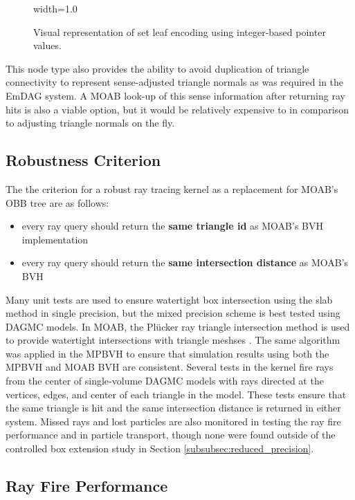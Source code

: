 \begin{figure}
  {width=1.0\textwidth}
  \caption[Graphic of surface root node encoding.]{Visual representation of set
    leaf encoding using integer-based pointer values.}
  \label{fig:set_leaf_encoding}
\end{figure}

This node type also provides the ability to avoid duplication of triangle
connectivity to represent sense-adjusted triangle normals as was required in the
EmDAG system. A MOAB look-up of this sense information after returning ray hits
is also a viable option, but it would be relatively expensive to in comparison
to adjusting triangle normals on the fly.

\subsection{Robustness Criterion}

The the criterion for a robust ray tracing kernel as a replacement for MOAB's
OBB tree are as follows:

 \begin{itemize} 
  \item every ray query should return the \textbf{same triangle id} as MOAB's BVH
    implementation
  \item every ray query should return the \textbf{same intersection distance} as MOAB's BVH
 \end{itemize} 

Many unit tests are used to ensure watertight box intersection using the slab
method \cite{Kay_1986} in single precision, but the mixed precision scheme is
best tested using DAGMC models. In MOAB, the Pl\"{u}cker ray triangle
intersection method is used to provide watertight intersections with triangle
meshses \cite{Platis_2003}. The same algorithm was applied in the MPBVH to
ensure that simulation results using both the MPBVH and MOAB BVH are
consistent. Several tests in the kernel fire rays from the center of
single-volume DAGMC models with rays directed at the vertices, edges, and center
of each triangle in the model. These tests ensure that the same triangle is hit
and the same intersection distance is returned in either
system. Missed rays and lost particles are also monitored in testing the ray fire
performance and in particle transport, though none were found outside of the
controlled box extension study in Section \ref{subsubsec:reduced_precision}.

\subsection{Ray Fire Performance}\label{sec:mpbvh_rf_perf}

